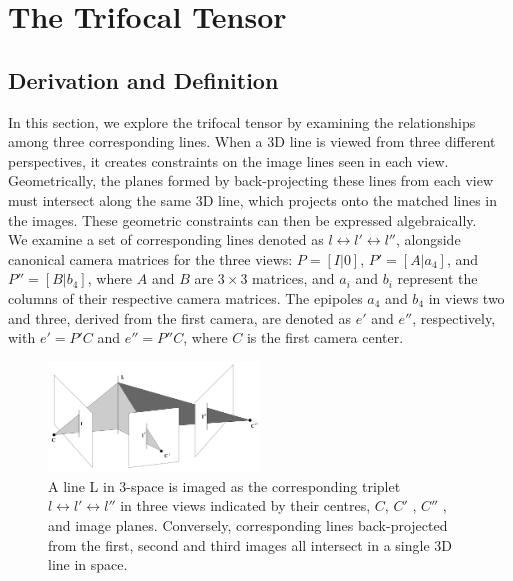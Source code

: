 \section{The Trifocal Tensor}\label{sec:tft}

\subsection{Derivation and Definition}
In this section, we explore the trifocal tensor by examining the relationships among three corresponding lines. When a 3D line is viewed from three different perspectives, it creates constraints on the image lines seen in each view. Geometrically, the planes formed by back-projecting these lines from each view must intersect along the same 3D line, which projects onto the matched lines in the images. These geometric constraints can then be expressed algebraically.\\

We examine a set of corresponding lines denoted as \( l \leftrightarrow l' \leftrightarrow l'' \), alongside canonical camera matrices for the three views: \( P = [I|0] \), \( P' = [A|a_4] \), and \( P'' = [B|b_4] \), where \( A \) and \( B \) are \( 3 \times 3 \) matrices, and \( a_i \) and \( b_i \) represent the columns of their respective camera matrices. The epipoles \( a_4 \) and \( b_4 \) in views two and three, derived from the first camera, are denoted as \( e' \) and \( e'' \), respectively, with \( e' = P'C \) and \( e'' = P''C \), where \( C \) is the first camera center.

\begin{figure}[h]
	\centering
	\includegraphics[width=0.5\textwidth]{Report/Figures/three-views.png}
	\caption[Trifocal Tensor Derivation]{A line L in 3-space is imaged as the corresponding triplet \( l \leftrightarrow l' \leftrightarrow l'' \) in three views indicated by their centres, \( C \), \( C' \) , \( C'' \) , and image planes. Conversely, corresponding lines back-projected from the first, second and third images all intersect in a single 3D line in space. \cite{1-multiple-view-geometry}}
\end{figure}


